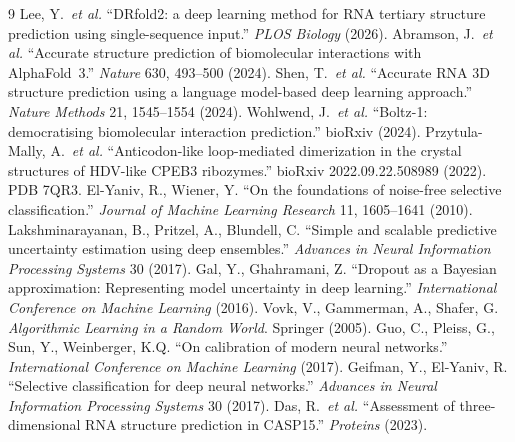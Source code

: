\documentclass[conference,10pt]{IEEEtran}
\begin{document}
\begin{thebibliography}{9}
 Lee, Y.~\textit{et al.} ``DRfold2: a deep
learning method for RNA tertiary structure prediction using
single-sequence input.'' \emph{PLOS Biology} (2026).
 Abramson, J.~\textit{et al.} ``Accurate structure
prediction of biomolecular interactions with AlphaFold~3.''
\emph{Nature} 630, 493--500 (2024).
 Shen, T.~\textit{et al.} ``Accurate RNA 3D
structure prediction using a language model-based deep learning
approach.'' \emph{Nature Methods} 21, 1545--1554 (2024).
 Wohlwend, J.~\textit{et al.} ``Boltz-1:
democratising biomolecular interaction prediction.'' bioRxiv (2024).
 Przytula-Mally, A.~\textit{et al.}
``Anticodon-like loop-mediated dimerization in the crystal
structures of HDV-like CPEB3 ribozymes.'' bioRxiv
2022.09.22.508989 (2022). PDB 7QR3.
 El-Yaniv, R., Wiener, Y. ``On the
foundations of noise-free selective classification.'' \emph{Journal
of Machine Learning Research} 11, 1605--1641 (2010).
 Lakshminarayanan, B., Pritzel, A.,
Blundell, C. ``Simple and scalable predictive uncertainty
estimation using deep ensembles.'' \emph{Advances in Neural
Information Processing Systems} 30 (2017).
 Gal, Y., Ghahramani, Z. ``Dropout as a Bayesian
approximation: Representing model uncertainty in deep learning.''
\emph{International Conference on Machine Learning} (2016).
 Vovk, V., Gammerman, A., Shafer, G.
\emph{Algorithmic Learning in a Random World}. Springer (2005).
 Guo, C., Pleiss, G., Sun, Y., Weinberger, K.Q.
``On calibration of modern neural networks.''
\emph{International Conference on Machine Learning} (2017).
 Geifman, Y., El-Yaniv, R. ``Selective
classification for deep neural networks.''
\emph{Advances in Neural Information Processing Systems} 30 (2017).
 Das, R.~\textit{et al.} ``Assessment of
three-dimensional RNA structure prediction in CASP15.''
\emph{Proteins} (2023).
\end{thebibliography}
\end{document}
